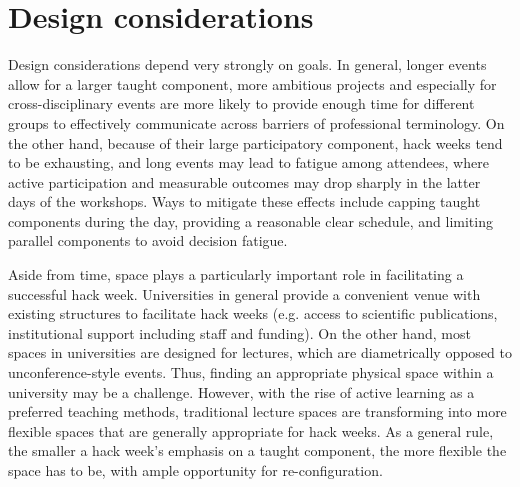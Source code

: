 \section*{Design considerations}

Design considerations depend very strongly on goals.
In general, longer events allow for a larger taught component, more ambitious projects and especially for cross-disciplinary events are more likely to provide enough time for different groups to effectively communicate across barriers of professional terminology.
On the other hand, because of their large participatory component, hack weeks tend to be exhausting, and long events may lead to fatigue among attendees, where active participation and measurable outcomes may drop sharply in the latter days of the workshops.
Ways to mitigate these effects include capping taught components during the day, providing a reasonable clear schedule, and limiting parallel components to avoid decision fatigue.

Aside from time, space plays a particularly important role in facilitating a successful hack week.
Universities in general provide a convenient venue with existing structures to facilitate hack weeks (e.g. access to scientific publications, institutional support including staff and funding).
On the other hand, most spaces in universities are designed for lectures, which are diametrically opposed to unconference-style events.
Thus, finding an appropriate physical space within a university may be a challenge.
However, with the rise of active learning as a preferred teaching methods, traditional lecture spaces are transforming into more flexible spaces that are generally appropriate for hack weeks.
As a general rule, the smaller a hack week's emphasis on a taught component, the more flexible the space has to be, with ample opportunity for re-configuration.

